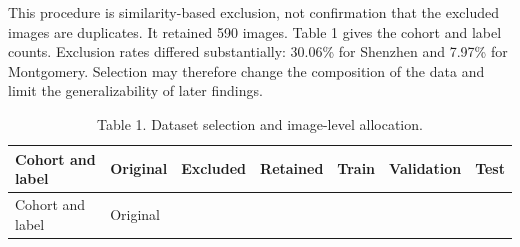 \documentclass[
]{article}
\begin{document}
This procedure is similarity-based exclusion, not confirmation that the
excluded images are duplicates. It retained 590 images. Table 1 gives
the cohort and label counts. Exclusion rates differed substantially:
30.06\% for Shenzhen and 7.97\% for Montgomery. Selection may therefore
change the composition of the data and limit the generalizability of
later findings.

\begin{longtable}[]{@{}
  >{\raggedright\arraybackslash}p{}
  >{\raggedleft\arraybackslash}p{}
  >{\raggedleft\arraybackslash}p{}
  >{\raggedleft\arraybackslash}p{}
  >{\raggedleft\arraybackslash}p{}
  >{\raggedleft\arraybackslash}p{}
  >{\raggedleft\arraybackslash}p{}@{}}
\caption{Table 1. Dataset selection and image-level
allocation.}\tabularnewline
\toprule\noalign{}
\begin{minipage}[b]{\linewidth}\raggedright
Cohort and label
\end{minipage} & \begin{minipage}[b]{\linewidth}\raggedleft
Original
\end{minipage} & \begin{minipage}[b]{\linewidth}\raggedleft
Excluded
\end{minipage} & \begin{minipage}[b]{\linewidth}\raggedleft
Retained
\end{minipage} & \begin{minipage}[b]{\linewidth}\raggedleft
Train
\end{minipage} & \begin{minipage}[b]{\linewidth}\raggedleft
Validation
\end{minipage} & \begin{minipage}[b]{\linewidth}\raggedleft
Test
\end{minipage} \\
\midrule\noalign{}
\endfirsthead
\toprule\noalign{}
\begin{minipage}[b]{\linewidth}\raggedright
Cohort and label
\end{minipage} & \begin{minipage}[b]{\linewidth}\raggedleft
Original
\end{minipage} & \begin{minipage}[b]{\linewidth}\raggedleft

\end{minipage}
\end{longtable}
\end{document}
